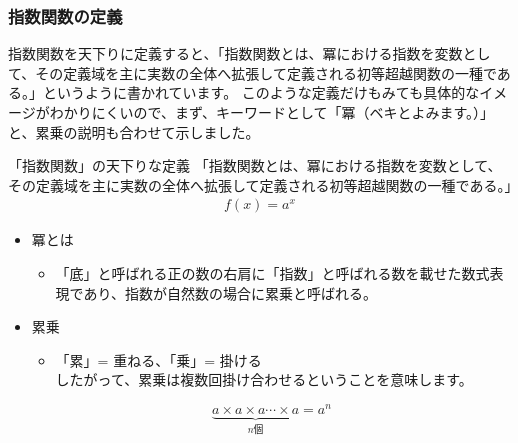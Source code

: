 \documentclass[uplatex,dvipdfmx,a4paper,11pt]{jsarticle}
\begin{document}
\subsubsection{指数関数の定義}
指数関数を天下りに定義すると、「指数関数とは、冪における指数を変数として、その定義域を主に実数の全体へ拡張して定義される初等超越関数の一種である。」というように書かれています。
このような定義だけもみても具体的なイメージがわかりにくいので、まず、キーワードとして「冪（ベキとよみます。）」と、累乗の説明も合わせて示しました。
\large
\begin{itembox}[l]{「指数関数」の天下りな定義}
	「指数関数とは、冪における指数を変数として、その定義域を主に実数の全体へ拡張して定義される初等超越関数の一種である。」
	\begin{align*}
		f(x) = a^x
	\end{align*}
	\begin{itemize}
		\item 冪とは
		\begin{itemize}
			\item 「底」と呼ばれる正の数の右肩に「指数」と呼ばれる数を載せた数式表現であり、指数が自然数の場合に累乗と呼ばれる。
		\end{itemize}
		\item 累乗
		\begin{itemize}
			\item 「累」= 重ねる、「乗」= 掛ける\\
			したがって、累乗は複数回掛け合わせるということを意味します。
		\end{itemize}
		\begin{equation*}
			\underbrace{a\times a\times a \cdots \times a}_{\text{$n$個}} = a^n
		\end{equation*}
	\end{itemize}
\end{itembox}
\normalsize
\end{document}
